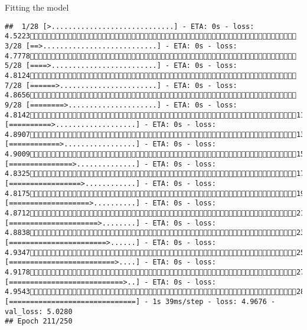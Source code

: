 \documentclass[
  ignorenonframetext,
]{beamer}
\begin{document}
\begin{frame}[fragile]{Fitting the model}
\begin{verbatim}
##  1/28 [>.............................] - ETA: 0s - loss: 4.5223 3/28 [==>...........................] - ETA: 0s - loss: 4.7778 5/28 [====>.........................] - ETA: 0s - loss: 4.8124 7/28 [======>.......................] - ETA: 0s - loss: 4.8656 9/28 [========>.....................] - ETA: 0s - loss: 4.814211/28 [==========>...................] - ETA: 0s - loss: 4.890713/28 [============>.................] - ETA: 0s - loss: 4.900915/28 [===============>..............] - ETA: 0s - loss: 4.832517/28 [=================>............] - ETA: 0s - loss: 4.817519/28 [===================>..........] - ETA: 0s - loss: 4.871221/28 [=====================>........] - ETA: 0s - loss: 4.883823/28 [=======================>......] - ETA: 0s - loss: 4.934725/28 [=========================>....] - ETA: 0s - loss: 4.917827/28 [===========================>..] - ETA: 0s - loss: 4.954328/28 [==============================] - 1s 39ms/step - loss: 4.9676 - val_loss: 5.0280
## Epoch 211/250

\end{verbatim}
\end{frame}
\end{document}
